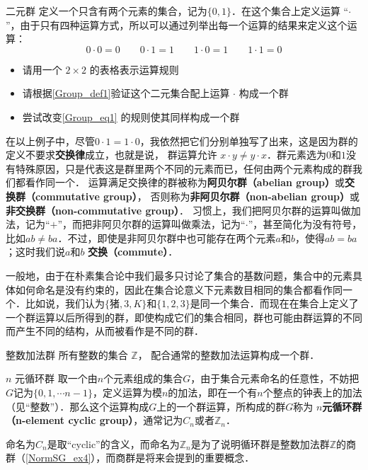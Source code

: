 \begin{exercise}{二元群}\label{Group_exe1}
定义一个只含有两个元素的集合，记为$\{0, 1\}$．在这个集合上定义运算 “$\cdot$”，由于只有四种运算方式，所以可以通过列举出每一个运算的结果来定义这个运算：
\begin{equation}\label{Group_eq1}
0\cdot0=0 \qquad 0\cdot1=1 \qquad 1\cdot0=1 \qquad 1\cdot1=0
\end{equation}
\begin{itemize}
\item 请用一个 $2\times2$ 的表格表示运算规则
\item 请根据\autoref{Group_def1}验证这个二元集合配上运算 $\cdot$ 构成一个群
\item 尝试改变\autoref{Group_eq1} 的规则使其同样构成一个群
\end{itemize}
\end{exercise}

在以上例子中，尽管$0\cdot1=1\cdot0$，我依然把它们分别单独写了出来，这是因为群的定义不要求\textbf{交换律}成立，也就是说， 群运算允许 $x\cdot y\neq y\cdot x$．群元素选为$0$和$1$没有特殊原因，只是代表这是群里两个不同的元素而已，任何由两个元素构成的群我们都看作同一个． 运算满足交换律的群被称为\textbf{阿贝尔群（abelian group）}或\textbf{交换群（commutative group）}， 否则称为\textbf{非阿贝尔群（non-abelian group）}或\textbf{非交换群（non-commutative group）}． 习惯上，我们把阿贝尔群的运算叫做加法，记为“$+$”，而把非阿贝尔群的运算叫做乘法，记为“$\cdot$”，甚至简化为没有符号，比如$ab\not= ba$．不过，即使是非阿贝尔群中也可能存在两个元素$a$和$b$，使得$ab=ba$；这时我们说$a$和$b$ \textbf{交换（commute）}．

一般地，由于在朴素集合论中我们最多只讨论了集合的基数问题，集合中的元素具体如何命名是没有约束的，因此在集合论意义下元素数目相同的集合都看作同一个．比如说，我们认为$\{\text{猪},3, K\}$和$\{1,2,3\}$是同一个集合．而现在在集合上定义了一个群运算以后所得到的群，即使构成它们的集合相同，群也可能由群运算的不同而产生不同的结构，从而被看作是不同的群．

\begin{example}{整数加法群}\label{Group_ex1}
所有整数的集合 $\mathbb Z$， 配合通常的整数加法运算构成一个群．
\end{example}

\begin{example}{$n$ 元循环群}\label{Group_ex2}
取一个由$n$个元素组成的集合$G$，由于集合元素命名的任意性，不妨把$G$记为$\{0, 1, \cdots n-1\}$，定义运算为模$n$的加法，即在一个有$n$个整点的钟表上的加法（见“整数”）．那么这个运算构成$G$上的一个群运算，所构成的群$G$称为 \textbf{$n$元循环群（n-element cyclic group）}，通常记为$C_n$或者$\mathbb{Z}_n$．

命名为$C_n$是取“cyclic”的含义，而命名为$\mathbb{Z}_n$是为了说明循环群是整数加法群$\mathbb{Z}$的商群（\autoref{NormSG_ex4}），而商群是将来会提到的重要概念．
\end{example}

